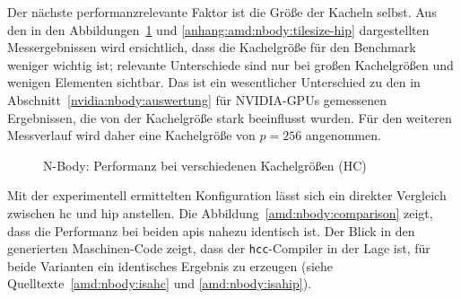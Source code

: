Der nächste performanzrelevante Faktor ist die Größe der Kacheln selbst. Aus den
in den Abbildungen~\ref{amd:nbody:tilesize-hc} und
\ref{anhang:amd:nbody:tilesize-hip} dargestellten Messergebnissen wird
ersichtlich, dass die Kachelgröße für den Benchmark weniger wichtig ist;
relevante Unterschiede sind nur bei großen Kachelgrößen und wenigen Elementen
sichtbar. Das ist ein wesentlicher Unterschied zu den in
Abschnitt~\ref{nvidia:nbody:auswertung} für NVIDIA-GPUs gemessenen Ergebnissen,
die von der Kachelgröße stark beeinflusst wurden. Für den weiteren Messverlauf
wird daher eine Kachelgröße von $p = 256$ angenommen.

\begin{figure}
    \centering
    \caption{N-Body: Performanz bei verschiedenen Kachelgrößen (HC)}
    \label{amd:nbody:tilesize-hc}
\end{figure}

Mit der experimentell ermittelten Konfiguration lässt sich ein direkter
Vergleich zwischen \gls{hc} und \gls{hip} anstellen. Die
Abbildung~\ref{amd:nbody:comparison} zeigt, dass die Performanz bei beiden
\gls{api}s nahezu identisch ist. Der Blick in den generierten Maschinen-Code
zeigt, dass der \texttt{hcc}-Compiler in der Lage ist, für beide Varianten ein
identisches Ergebnis zu erzeugen (siehe Quelltexte~\ref{amd:nbody:isahc} und
\ref{amd:nbody:isahip}).

